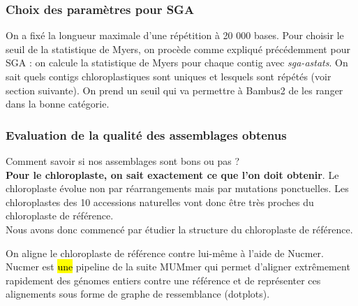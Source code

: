 \documentclass[a4paper]{article}
\newcommand{\rewrite}[1]{\todo[color=green!40]{#1}}
\newcommand{\hlrewrite}[2]{\sethlcolor{green} \hl{#1} \rewrite{#2}}
\begin{document}
\subsubsection{Choix des paramètres pour SGA}

On a fixé la longueur maximale d'une répétition à 20 000 bases. Pour choisir le seuil de la statistique de Myers, on procède comme expliqué précédemment pour SGA : on calcule la statistique de Myers pour chaque contig avec \textit{sga-astats}. On sait quels contigs chloroplastiques sont uniques et lesquels sont répétés (voir section suivante). On prend un seuil qui va permettre à Bambus2 de les ranger dans la bonne catégorie. 

\subsubsection{Evaluation de la qualité des assemblages obtenus}

\vspace{0.2cm}

Comment savoir si nos assemblages sont bons ou pas ? \\

\textbf{Pour le chloroplaste, on sait exactement ce que l'on doit obtenir}. Le chloroplaste évolue non par réarrangements mais par mutations ponctuelles. Les chloroplastes des 10 accessions naturelles vont donc être très proches du chloroplaste de référence. \\

Nous avons donc commencé par étudier la structure du chloroplaste de référence. 

On aligne le chloroplaste de référence contre lui-même à l'aide de Nucmer. Nucmer est \hlrewrite{une}{un} pipeline de la suite MUMmer qui permet d'aligner extrêmement rapidement des génomes entiers contre une référence et de représenter ces alignements sous forme de graphe de ressemblance (dotplots).  
\end{document}
